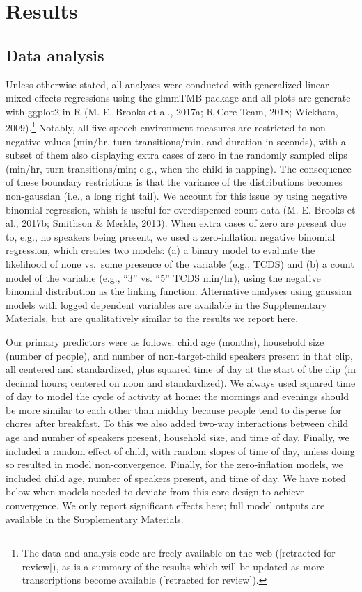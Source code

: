 \documentclass[floatsintext,man]{apa6}
\theoremstyle{definition}
\theoremstyle{definition}
\theoremstyle{definition}
\theoremstyle{remark}
\begin{document}
\section{Results}\label{results}

\subsection{Data analysis}\label{data-analysis}

Unless otherwise stated, all analyses were conducted with generalized
linear mixed-effects regressions using the glmmTMB package and all plots
are generate with ggplot2 in R (M. E. Brooks et al., 2017a; R Core Team,
2018; Wickham, 2009).\footnote{The data and analysis code are freely
  available on the web ({[}retracted for review{]}), as is a summary of
  the results which will be updated as more transcriptions become
  available ({[}retracted for review{]}).} Notably, all five speech
environment measures are restricted to non-negative values (min/hr, turn
transitions/min, and duration in seconds), with a subset of them also
displaying extra cases of zero in the randomly sampled clips (min/hr,
turn transitions/min; e.g., when the child is napping). The consequence
of these boundary restrictions is that the variance of the distributions
becomes non-gaussian (i.e., a long right tail). We account for this
issue by using negative binomial regression, whish is useful for
overdispersed count data (M. E. Brooks et al., 2017b; Smithson \&
Merkle, 2013). When extra cases of zero are present due to, e.g., no
speakers being present, we used a zero-inflation negative binomial
regression, which creates two models: (a) a binary model to evaluate the
likelihood of none vs.~some presence of the variable (e.g., TCDS) and
(b) a count model of the variable (e.g., \enquote{3} vs. \enquote{5}
TCDS min/hr), using the negative binomial distribution as the linking
function. Alternative analyses using gaussian models with logged
dependent variables are available in the Supplementary Materials, but
are qualitatively similar to the results we report here.

Our primary predictors were as follows: child age (months), household
size (number of people), and number of non-target-child speakers present
in that clip, all centered and standardized, plus squared time of day at
the start of the clip (in decimal hours; centered on noon and
standardized). We always used squared time of day to model the cycle of
activity at home: the mornings and evenings should be more similar to
each other than midday because people tend to disperse for chores after
breakfast. To this we also added two-way interactions between child age
and number of speakers present, household size, and time of day.
Finally, we included a random effect of child, with random slopes of
time of day, unless doing so resulted in model non-convergence. Finally,
for the zero-inflation models, we included child age, number of speakers
present, and time of day. We have noted below when models needed to
deviate from this core design to achieve convergence. We only report
significant effects here; full model outputs are available in the
Supplementary Materials.
\end{document}
